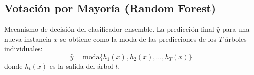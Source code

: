 \subsection*{Votación por Mayoría (Random Forest)}
Mecanismo de decisión del clasificador ensemble. La predicción final $\hat{y}$ para una nueva instancia $x$ se obtiene como la moda de las predicciones de los $T$ árboles individuales:
\begin{equation}
	\hat{y} = \text{moda}\{h_1(x), h_2(x), \dots, h_T(x)\}
	\label{eq:anexo_rf}
\end{equation}
donde $h_t(x)$ es la salida del árbol $t$.